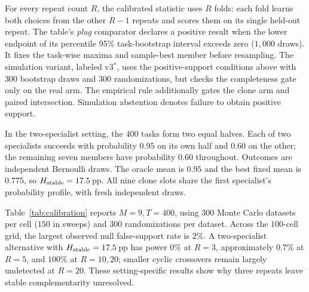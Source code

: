 For every repeat count $R$, the calibrated statistic uses $R$ folds:
each fold learns both choices from the other $R-1$ repeats and scores
them on its single held-out repeat. The table's \emph{plug} comparator
declares a positive result when the lower endpoint of its percentile
95\% task-bootstrap interval exceeds zero ($1{,}000$ draws).
It fixes the task-wise maxima and sample-best member before resampling.
The simulation variant, labeled v3$^\ast$, uses the positive-support
conditions above with $300$ bootstrap draws and $300$ randomizations,
but checks the completeness gate only on the real arm. The empirical
rule additionally gates the clone arm and paired intersection.
Simulation abstention denotes failure to obtain positive support.

In the two-specialist setting, the $400$ tasks form two equal halves.
Each of two specialists succeeds with probability $0.95$ on its own
half and $0.60$ on the other; the remaining seven members have
probability $0.60$ throughout. Outcomes are independent Bernoulli
draws. The oracle mean is $0.95$ and the best fixed mean is $0.775$,
so $H_{\rm stable}=17.5$\,pp. All nine clone slots share the first
specialist's probability profile, with fresh independent draws.

Table~\ref{tab:calibration} reports $M=9,T=400$, using $300$
Monte Carlo datasets per cell ($150$ in sweeps) and $300$
randomizations per dataset. Across the $100$-cell grid, the largest
observed null false-support rate is $2\%$. A two-specialist
alternative with $H_{\rm stable}=17.5$\,pp has power $0\%$ at
$R=3$, approximately $0.7\%$ at $R=5$, and $100\%$ at $R=10,20$;
smaller cyclic crossovers remain largely undetected at $R=20$.
These setting-specific results show why three repeats leave stable
complementarity unresolved.

\begin{table}[H]
\centering\small

\caption{\textbf{Three repeats can miss even a strong positive case.}
At $M=9,T=400$, null rows report false-support \% and alternative
rows report power \%; the final column gives $R=3$ abstention.
The simulated clone-calibrated rule (v3$^\ast$) rarely declares positive
support when stable complementarity is zero, but has little sensitivity
to the tested small and moderate crossovers.}
\label{tab:calibration}
\end{table}
